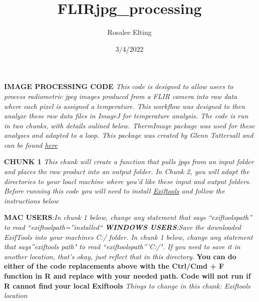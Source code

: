 \documentclass[
]{article}
\title{FLIRjpg\_processing}
\author{Rosalee Elting}
\date{3/4/2022}
\begin{document}
\maketitle

\textbf{IMAGE PROCESSING CODE} \emph{This code is designed to allow
users to process radiometric jpeg images produced from a FLIR camera
into raw data where each pixel is assigned a temperature. This workflow
was designed to then analyze these raw data files in ImageJ for
temperature analysis. The code is run in two chunks, with details
oulined below. ThermImage package was used for these analyses and
adapted to a loop. This package was created by Glenn Tattersall and can
be found \href{https://github.com/gtatters/Thermimage}{here}}

\textbf{CHUNK 1} \emph{This chunk will create a function that pulls jpgs
from an input folder and places the raw product into an output folder.
In Chunk 2, you will adapt the directories to your loacl machine where
you'd like these input and output folders. Before running this code you
will need to install \href{https://exiftool.org/install.htm}{Exiftools}
and follow the instructions below}

\textbf{MAC USERS}:\emph{In chunk 1 below, change any statement that
says ``exiftoolspath'' to read ``exiftoolpath=''installed``\emph{
\textbf{WINDOWS USERS}:}Save the downloaded ExifTools into your machines
C:/ folder. In chunk 1 below, change any statement that says''exiftools
path" to read ``exiftoolspath'''C:/". If you need to save it in another
location, that's okay, just reflect that in this directory.} \textbf{You
can do either of the code replacements above with the Ctrl/Cmd + F
function in R and replace with your needed path. Code will not run if R
cannot find your local Exiftools} \emph{Things to change in this chunk:
Exiftools location}
\end{document}
